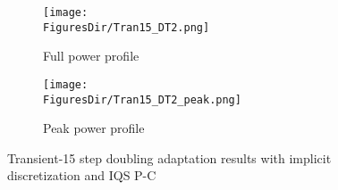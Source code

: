 \begin{figure}[!htbp]
\centering
\begin{subfigure}[!htbp]{0.75\textwidth}
\texttt{[image: \\FiguresDir/Tran15\_DT2.png]}
\caption{Full power profile}
\end{subfigure}
\begin{subfigure}[!htbp]{0.75\textwidth}
\texttt{[image: \\FiguresDir/Tran15\_DT2\_peak.png]}
\caption{Peak power profile}
\end{subfigure}
\caption{Transient-15 step doubling adaptation results with implicit discretization and IQS P-C}
\label{fig:Tran15_dt2}
\end{figure}


